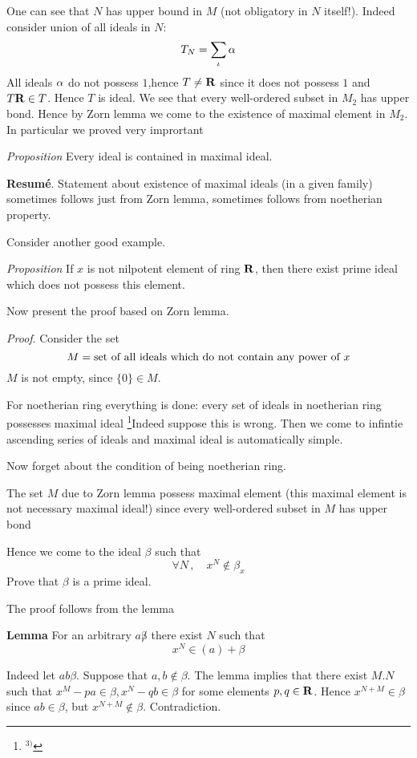   One can see that $N$ has upper bound in $M$
(not obligatory in $N$ itself!). Indeed consider
union of all ideals in $N$:
       $$
      T_N=\sum_\iota \alpha
       $$
All ideals $\alpha$ do not possess $1$,hence
$T\not={\bf R}$ since it does not possess $1$ and $T{\bf R}\in T$. Hence
$T$ is ideal. We see that every well-ordered subset in $M_2$
has upper bond. Hence by Zorn lemma we come to the existence
of maximal element in $M_2$. In particular we proved very imprortant 

{\it Proposition} Every ideal is contained in maximal ideal.

\bigskip


 {\bf Resum\'e}.  
  Statement about existence of maximal ideals (in a given family) 
sometimes
follows just from  Zorn lemma, sometimes follows from noetherian
property.

Consider another good example.


{\it Proposition } If $x$ is not nilpotent element of ring ${\bf R}$,
then there exist prime ideal which does not possess this element.


Now present the proof based on Zorn lemma.

{\sl Proof}. Consider the set
       $$
M=\hbox {set of all ideals which do not contain
any  power of $x$}
       $$
$M$ is not empty, since $\{0\}\in M$.

  For noetherian ring everything is done:
every set of ideals in noetherian ring possesses  maximal ideal
 \footnote{$^{3)}$}{Indeed suppose this is wrong. Then we come
to infintie ascending series of ideals} and maximal ideal is automatically
simple.

 Now forget about the condition of being noetherian ring.

The set $M$ due to Zorn lemma possess maximal element
(this maximal element is not necessary maximal ideal!)
since every well-ordered subset in $M$ has upper bond

  Hence we come to the ideal $\beta$ such that
            $$
\forall N\,,\quad x^N\not\in \beta_x
             $$
Prove that $\beta$ is a prime ideal.

The proof follows from the lemma

{\bf Lemma} For an arbitrary $a\not \beta$ there exist $N$
such that
        $$
      x^N\in (a)+\beta
        $$

Indeed let $ab\beta$. Suppose that $a,b\not\in\beta$.
The lemma implies that there exist $M.N$ such that 
$x^M-pa\in\beta, x^N-qb\in \beta$ for some elements $p,q\in {\bf R}$.
Hence $x^{N+M}\in\beta$ since $ab\in\beta$,  but $x^{N+M}\not\in \beta$.
   Contradiction.

